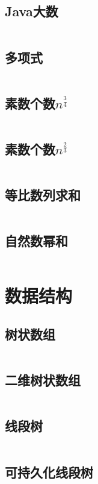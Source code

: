 \documentclass[a4paper,6pt]{article}
\begin{document}
\subsection{Java大数}
\inputminted[breaklines]{java}{math/Main.java}
\subsection{多项式}
\inputminted[breaklines]{c++}{math/polynomial.cpp}
\subsection{素数个数$n^{\frac{3}{4}}$}
\inputminted[breaklines]{c++}{math/short-prime-num.cpp}
\subsection{素数个数$n^{\frac{2}{3}}$}
\inputminted[breaklines]{c++}{math/prime-num.cpp}
\subsection{等比数列求和}
\inputminted[breaklines]{c++}{math/Geometric-sequence-sum.cpp}
\subsection{自然数幂和}
\inputminted[breaklines]{c++}{math/sum-of-n^k.cpp}

\newpage
\section{数据结构}
\subsection{树状数组}
\inputminted[breaklines]{c++}{data-structure/BIT.cpp}
\subsection{二维树状数组}
\inputminted[breaklines]{c++}{data-structure/2-BIT.cpp}
\subsection{线段树}
\inputminted[breaklines]{c++}{data-structure/segment-tree.cpp}
\subsection{可持久化线段树}
\inputminted[breaklines]{c++}{data-structure/persistence-tree-tag.cpp}
\end{document}

